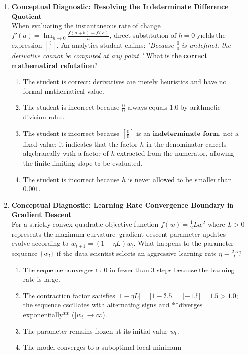 \begin{enumerate}[resume]
\item \textbf{Conceptual Diagnostic: Resolving the Indeterminate Difference Quotient} \\
When evaluating the instantaneous rate of change $f'(a) = \lim_{h \to 0} \frac{f(a+h) - f(a)}{h}$, direct substitution of $h = 0$ yields the expression $\left[\frac{0}{0}\right]$. An analytics student claims: \textit{"Because $\frac{0}{0}$ is undefined, the derivative cannot be computed at any point."} What is the \textbf{correct mathematical refutation}?
\begin{enumerate}
    \item The student is correct; derivatives are merely heuristics and have no formal mathematical value.
    \item The student is incorrect because $\frac{0}{0}$ always equals $1.0$ by arithmetic division rules.
    \item The student is incorrect because $\left[\frac{0}{0}\right]$ is an \textbf{indeterminate form}, not a fixed value; it indicates that the factor $h$ in the denominator cancels algebraically with a factor of $h$ extracted from the numerator, allowing the finite limiting slope to be evaluated.
    \item The student is incorrect because $h$ is never allowed to be smaller than $0.001$.
\end{enumerate}

\item \textbf{Conceptual Diagnostic: Learning Rate Convergence Boundary in Gradient Descent} \\
For a strictly convex quadratic objective function $f(w) = \frac{1}{2} L w^2$ where $L > 0$ represents the maximum curvature, gradient descent parameter updates evolve according to $w_{t+1} = (1 - \eta L) w_t$. What happens to the parameter sequence $\left\{w_t\right\}$ if the data scientist selects an aggressive learning rate $\eta = \frac{2.5}{L}$?
\begin{enumerate}
    \item The sequence converges to $0$ in fewer than 3 steps because the learning rate is large.
    \item The contraction factor satisfies $|1 - \eta L| = |1 - 2.5| = |-1.5| = 1.5 > 1.0$; the sequence oscillates with alternating signs and **diverges exponentially** ($|w_t| \to \infty$).
    \item The parameter remains frozen at its initial value $w_0$.
    \item The model converges to a suboptimal local minimum.
\end{enumerate}
\end{enumerate}
